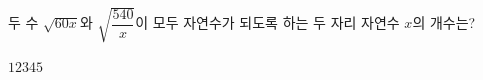 두 수 $\sqrt{60x}$와 $\sqrt{\dfrac{540}{x}}$이 모두 자연수가 되도록 하는 두 자리 자연수 $x$의 개수는?
\begin{choices32}{$1$}{$2$}{$3$}{$4$}{$5$}\end{choices32}
